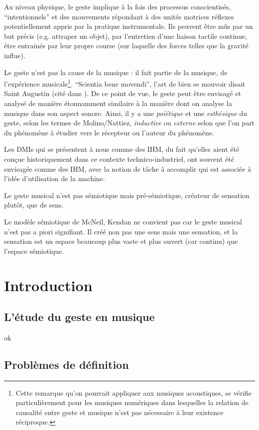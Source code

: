 Au niveau physique, le geste implique à la fois des processus conscientisés, ``intentionnels'' et des mouvements répondant à des unités motrices réflexes potentiellement appris par la pratique instrumentale. Ils peuvent être mûs par un but précis (e.g. attraper un objet), par l'entretien d'une liaison tactile continue, être entrainés par leur propre course (sur laquelle des forces telles que la gravité influe).


Le geste n'est pas la cause de la musique : il fait partie de la musique, de l'expérience musicale\footnote{Cette remarque qu'on pourrait appliquer aux musiques acoustiques, se vérifie particulièrement pour les musiques numériques dans lesquelles la relation de causalité entre geste et musique n'est pas nécessaire à leur existence réciproque.}. ``Scientia bene movendi'', l'art de bien se mouvoir disait Saint Augustin (cité dans \cite{delalande_geste_1988}). De ce point de vue, le geste peut être envisagé et analysé de manière étonnamment similaire à la manière dont on analyse la musique dans son aspect sonore. Ainsi, il y a une \textit{poïétique} et une \textit{esthésique} du geste, selon les termes de Molino/Nattiez, \textit{inductive} ou \textit{externe} selon que l'on part du phénomène à étudier vers le récepteur ou l'auteur du phénomène. 

Les DMIs qui se présentent à nous comme des IHM, du fait qu'elles aient été conçue historiquement dans ce contexte technico-industriel, ont souvent été envisagée comme des IHM, avec la notion de tâche à accomplir qui est associée à l'idée d'utilisation de la machine.

Le geste musical n'est pas sémiotique mais pré-sémiotique, créateur de sensation plutôt, que de sens.


Le modèle sémiotique de McNeil, Kendan ne convient pas car le geste musical n'est pas a piori signifiant. Il créé non pas une sens mais une sensation, et la sensation est un espace beaucoup plus vaste et plus ouvert (car continu) que l'espace sémiotique.

\section{Introduction}
	\subsection{L'étude du geste en musique}
		ok
	\subsection{Problèmes de définition}
